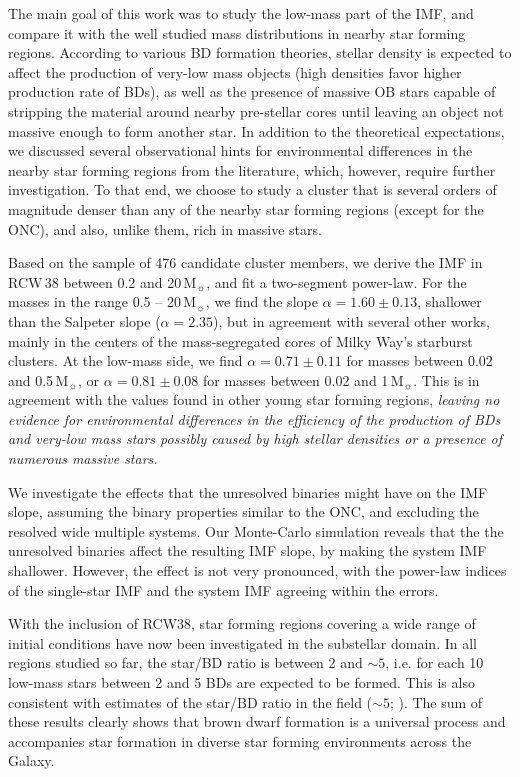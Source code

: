 \documentclass[a4paper,fleqn,usenatbib]{mnras}
\begin{document}
The main goal of this work was to study the low-mass part of the IMF, and compare it with the well studied
mass distributions in nearby star forming regions. According to various BD formation theories, stellar density
is expected to affect the production of very-low mass objects (high densities favor higher production rate of BDs), as 
well as the presence of massive OB stars capable of stripping the material around nearby pre-stellar cores until leaving
an object not massive enough to form another star. In addition to the theoretical expectations, we discussed several observational hints 
for environmental differences in the nearby star forming regions from the literature, which, however, require further investigation. To that end, we choose
to study a cluster that is several orders of magnitude denser than any of the nearby star forming regions (except for the ONC), 
and also, unlike them, rich in massive stars.

Based on the sample of 476 candidate cluster members, we derive the IMF in RCW\,38 between 0.2 and 20\,M$_{\sun}$, and fit a two-segment power-law.
For the masses in the range 0.5 -- 20\,M$_{\sun}$, we find the slope $\alpha = 1.60 \pm 0.13$, shallower than the Salpeter slope ($\alpha=2.35$), but 
in agreement with several other works, mainly in the centers of the mass-segregated cores of Milky Way's starburst clusters. 
At the low-mass side, we find $\alpha = 0.71 \pm 0.11$ for masses between 0.02 and 0.5\,M$_{\sun}$,
or $\alpha = 0.81 \pm 0.08$ for masses between 0.02 and 1\,M$_{\sun}$. This is in agreement  with the values found in other young star forming regions, 
{\it leaving no evidence for environmental differences in the efficiency of the production of BDs and very-low mass stars
possibly caused by high stellar densities or a presence of numerous massive stars.}

We investigate the effects that the unresolved binaries might have on the IMF slope, assuming the binary
properties similar to the ONC, and excluding the resolved wide multiple systems. Our Monte-Carlo simulation 
reveals that the the unresolved binaries affect the resulting IMF slope, by making the system IMF shallower.
However, the effect is not very pronounced, with the power-law indices of the single-star IMF and the system IMF agreeing within the errors.

With the inclusion of RCW38, star forming regions covering a wide range
of initial conditions have now been investigated in the substellar domain.
In all regions studied so far, the star/BD ratio is between 2 and $\sim5$, 
i.e. for each 10 low-mass stars between 2 and 5 BDs are expected 
to be formed. This is also consistent with estimates of the star/BD ratio
in the field ($\sim5$; \citealt{bihain&scholz16}). The sum of these results clearly shows that brown dwarf
formation is a universal process and accompanies star formation in
diverse star forming environments across the Galaxy.
\end{document}
